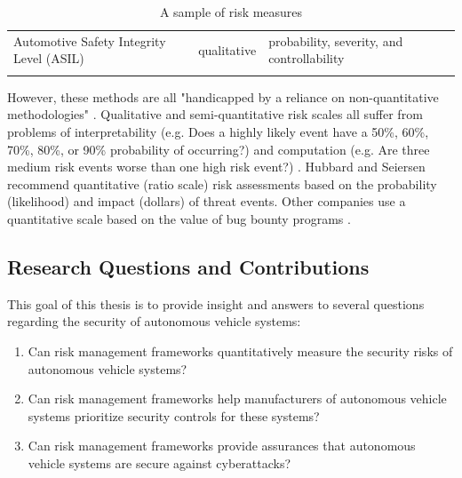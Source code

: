 \documentclass{article}
\begin{document}
\begin{landscape}
\begin{longtable}{p{5cm} | p{4cm} | p{8cm} | p{5cm}}
Automotive Safety Integrity Level (ASIL) & qualitative & probability, severity, and controllability                                                                                                                                                                                                                                                                                                                                                                                                                                     & \cite{international_organization_for_standardization_iso_2011} \\
    \caption{A sample of risk measures}
    \label{table:risk_measures}
\end{longtable}
\end{landscape}

However, these methods are all "handicapped by a reliance on non-quantitative methodologies" \citep{soo_hoo_how_2000}. Qualitative and semi-quantitative risk scales all suffer from problems of interpretability (e.g. Does a highly likely event have a 50\%, 60\%, 70\%, 80\%, or 90\% probability of occurring?) and computation (e.g. Are three medium risk events worse than one high risk event?) \citep[chapter 5]{hubbard_how_2016}. Hubbard and Seiersen recommend quantitative (ratio scale) risk assessments based on the probability (likelihood) and impact (dollars) of threat events. Other companies use a quantitative scale based on the value of bug bounty programs \citep{held_measuring_2017}.

\subsection{Research Questions and Contributions}

This goal of this thesis is to provide insight and answers to several questions regarding the security of autonomous vehicle systems:

\begin{enumerate}
\item Can risk management frameworks quantitatively measure the security risks of autonomous vehicle systems? 
\item Can risk management frameworks help manufacturers of autonomous vehicle systems prioritize security controls for these systems?
\item Can risk management frameworks provide assurances that autonomous vehicle systems are secure against cyberattacks?
\end{enumerate}
\end{document}
